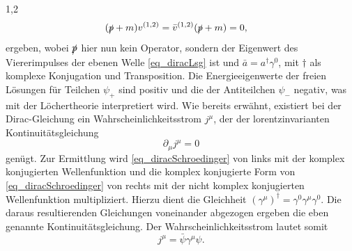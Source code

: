 \documentclass[11pt,a4paper,twoside,draft]{report}
\begin{document}
\begin{spacing}{1,2}
\begin{align}
 (\slashed{p} + m )v^{(1,2)} &= \bar v^{(1,2)}(\slashed{p}+m) = 0,
\end{align}
ergeben, wobei $\slashed{p}$ hier nun kein Operator, sondern der Eigenwert des Viererimpulses der ebenen Welle \eqref{eq_diracLsg} ist und $\bar a = a^\dagger \gamma^0$,
 mit $\dagger$ als komplexe Konjugation und Transposition. %
Die Energieeigenwerte der freien Lösungen für Teilchen $\psi_+$ sind positiv und die der Antiteilchen $\psi_-$ negativ, was mit der Löchertheorie interpretiert
wird. Wie bereits erwähnt, existiert bei der Dirac-Gleichung ein Wahrscheinlichkeitsstrom $j^\mu$, der der lorentzinvarianten Kontinuitätsgleichung
\begin{equation}
 \partial_\mu j^\mu = 0
\end{equation}
genügt. Zur Ermittlung wird \eqref{eq_diracSchroedinger} von links mit der komplex konjugierten Wellenfunktion und die komplex konjugierte
Form von \eqref{eq_diracSchroedinger} von rechts mit der nicht komplex konjugierten Wellenfunktion multipliziert. Hierzu dient die Gleichheit 
$(\gamma^\mu)^\dagger = \gamma^0\gamma^\mu\gamma^0$. Die daraus resultierenden Gleichungen voneinander abgezogen ergeben die eben genannte Kontinuitätsgleichung.
Der Wahrscheinlichkeitsstrom lautet somit
\begin{equation}
 j^\mu = \bar \psi \gamma^\mu \psi.
 \label{eq_diracstrom}
\end{equation}



\end{spacing}
\end{document}
